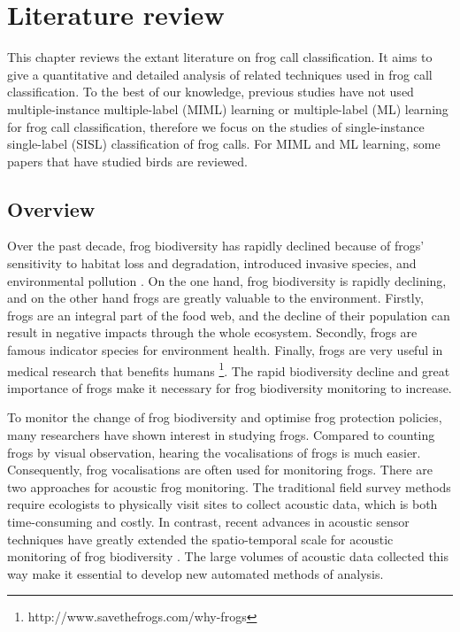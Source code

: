 
\chapter[Literature review]{Literature review}
\label{cha:cha2LiteratureReview}

This chapter reviews the extant literature on frog call classification. 
It aims to give a quantitative and detailed analysis of related techniques used in frog call classification. To the best of our knowledge, previous studies have not used multiple-instance multiple-label (MIML) learning or multiple-label (ML) learning for frog call classification, therefore we focus on the studies of single-instance single-label (SISL) classification of frog calls. For MIML and ML learning, some papers that have studied birds are reviewed.

\section{Overview}
\label{intro}
Over the past decade, frog biodiversity has rapidly declined because of frogs' sensitivity to habitat loss and degradation, introduced invasive species, and environmental pollution \citep{dudgeon2006freshwater}. On the one hand, frog biodiversity is rapidly declining, and on the other hand frogs are greatly valuable to the environment. Firstly, frogs are an integral part of the food web, and the decline of their population can result in negative impacts through the whole ecosystem. Secondly, frogs are famous indicator species for environment health. Finally, frogs are very useful in medical research that benefits humans \footnote{http://www.savethefrogs.com/why-frogs}. The rapid biodiversity decline and great importance of frogs make it necessary for frog biodiversity monitoring to increase. 

To monitor the change of frog biodiversity and optimise frog protection policies, many researchers have shown interest in studying frogs. Compared to counting frogs by visual observation, hearing the vocalisations of frogs is much easier. Consequently, frog vocalisations are often used for monitoring frogs. There are two approaches for acoustic frog monitoring. The traditional field survey methods require ecologists to physically visit sites to collect acoustic data, which is both time-consuming and costly. In contrast, recent advances in acoustic sensor techniques have greatly extended the spatio-temporal scale for acoustic monitoring of frog biodiversity \citep{wimmer2013analysing}. The large volumes of acoustic data collected this way make it essential to develop new automated methods of analysis. 



